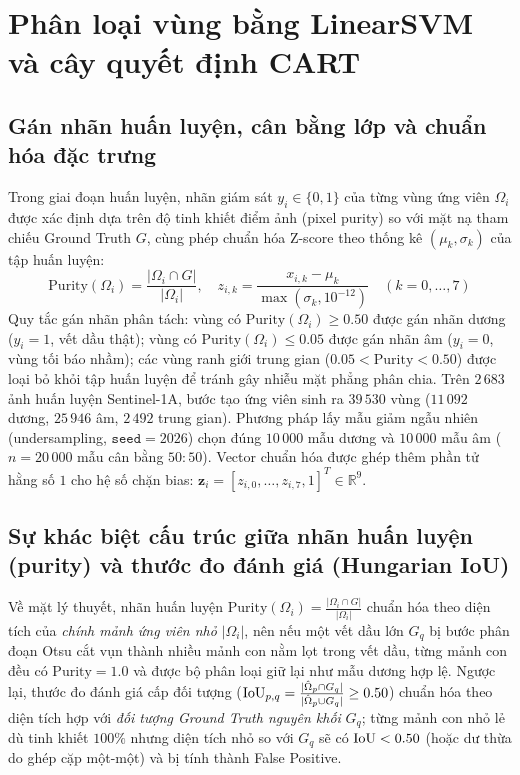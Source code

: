 \section{Phân loại vùng bằng LinearSVM và cây quyết định CART}
\label{sec:phan_loai_svm_cart}

\subsection{Gán nhãn huấn luyện, cân bằng lớp và chuẩn hóa đặc trưng}

Trong giai đoạn huấn luyện, nhãn giám sát $y_i \in \{0, 1\}$ của từng vùng ứng viên $\Omega_i$ được xác định dựa trên độ tinh khiết điểm ảnh (pixel purity) so với mặt nạ tham chiếu Ground Truth $G$, cùng phép chuẩn hóa Z-score theo thống kê $(\mu_k, \sigma_k)$ của tập huấn luyện:
\begin{equation}
\mathrm{Purity}(\Omega_i) = \frac{|\Omega_i \cap G|}{|\Omega_i|}, \quad z_{i,k} = \frac{x_{i,k} - \mu_k}{\max(\sigma_k, 10^{-12})} \quad (k = 0, \dots, 7)
\label{eq:purity_definition}
\end{equation}
Quy tắc gán nhãn phân tách: vùng có $\mathrm{Purity}(\Omega_i) \ge 0.50$ được gán nhãn dương ($y_i = 1$, vết dầu thật); vùng có $\mathrm{Purity}(\Omega_i) \le 0.05$ được gán nhãn âm ($y_i = 0$, vùng tối báo nhầm); các vùng ranh giới trung gian ($0.05 < \mathrm{Purity} < 0.50$) được loại bỏ khỏi tập huấn luyện để tránh gây nhiễu mặt phẳng phân chia. Trên $2\,683$ ảnh huấn luyện Sentinel-1A, bước tạo ứng viên sinh ra $39\,530$ vùng ($11\,092$ dương, $25\,946$ âm, $2\,492$ trung gian). Phương pháp lấy mẫu giảm ngẫu nhiên (undersampling, $\texttt{seed} = 2026$) chọn đúng $10\,000$ mẫu dương và $10\,000$ mẫu âm ($n = 20\,000$ mẫu cân bằng $50:50$). Vector chuẩn hóa được ghép thêm phần tử hằng số $1$ cho hệ số chặn bias: $\mathbf{z}_i = [z_{i,0}, \dots, z_{i,7}, 1]^T \in \mathbb{R}^9$.

\subsection{Sự khác biệt cấu trúc giữa nhãn huấn luyện (purity) và thước đo đánh giá (Hungarian IoU)}

Về mặt lý thuyết, nhãn huấn luyện $\mathrm{Purity}(\Omega_i) = \frac{|\Omega_i \cap G|}{|\Omega_i|}$ chuẩn hóa theo diện tích của \textit{chính mảnh ứng viên nhỏ} $|\Omega_i|$, nên nếu một vết dầu lớn $G_q$ bị bước phân đoạn Otsu cắt vụn thành nhiều mảnh con nằm lọt trong vết dầu, từng mảnh con đều có $\mathrm{Purity} = 1.0$ và được bộ phân loại giữ lại như mẫu dương hợp lệ. Ngược lại, thước đo đánh giá cấp đối tượng ($\mathrm{IoU}_{p,q} = \frac{|\hat{\Omega}_p \cap G_q|}{|\hat{\Omega}_p \cup G_q|} \ge 0.50$) chuẩn hóa theo diện tích hợp với \textit{đối tượng Ground Truth nguyên khối} $G_q$; từng mảnh con nhỏ lẻ dù tinh khiết $100\%$ nhưng diện tích nhỏ so với $G_q$ sẽ có $\mathrm{IoU} < 0.50$ (hoặc dư thừa do ghép cặp một-một) và bị tính thành False Positive.

